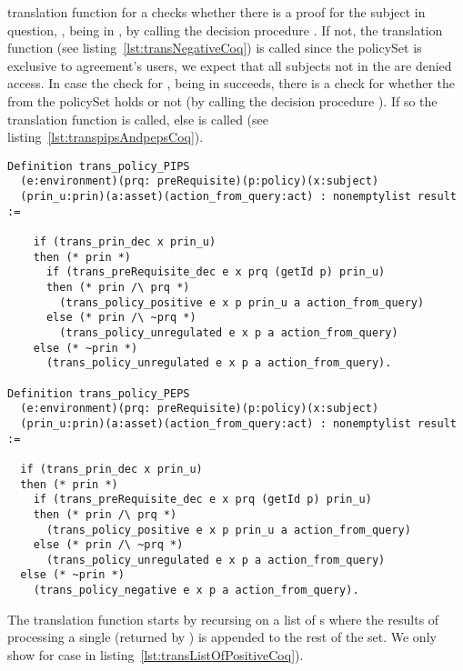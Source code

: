  translation function for a  checks whether there is a proof for the subject in question, , being in , by calling the decision procedure . If not, the translation function  (see listing~\ref{lst:transNegativeCoq}) is called since the policySet is exclusive to agreement's users, we expect that all subjects not in the  are denied access. In case the check for , being in  succeeds, there is a check for whether the  from the policySet holds or not (by calling the decision procedure ). If so the translation function  is called, else  is called (see listing~\ref{lst:transpipsAndpepsCoq}).


\begin{minipage}{\linewidth}
\begin{lstlisting}
Definition trans_policy_PIPS
  (e:environment)(prq: preRequisite)(p:policy)(x:subject)
  (prin_u:prin)(a:asset)(action_from_query:act) : nonemptylist result :=
  
    if (trans_prin_dec x prin_u)
    then (* prin *)
      if (trans_preRequisite_dec e x prq (getId p) prin_u)
      then (* prin /\ prq *)
        (trans_policy_positive e x p prin_u a action_from_query)                           
      else (* prin /\ ~prq *)
        (trans_policy_unregulated e x p a action_from_query)
    else (* ~prin *)
      (trans_policy_unregulated e x p a action_from_query).

Definition trans_policy_PEPS
  (e:environment)(prq: preRequisite)(p:policy)(x:subject)
  (prin_u:prin)(a:asset)(action_from_query:act) : nonemptylist result :=
  
  if (trans_prin_dec x prin_u)
  then (* prin *)
    if (trans_preRequisite_dec e x prq (getId p) prin_u)
    then (* prin /\ prq *)
      (trans_policy_positive e x p prin_u a action_from_query)
    else (* prin /\ ~prq *)
      (trans_policy_unregulated e x p a action_from_query)
  else (* ~prin *)
    (trans_policy_negative e x p a action_from_query).

\end{lstlisting}
\end{minipage}


The translation function starts by recursing on a list of s where the results of processing a single  (returned by ) is appended to the rest of the set. We only show  for  case in listing~\ref{lst:transListOfPositiveCoq}). 


